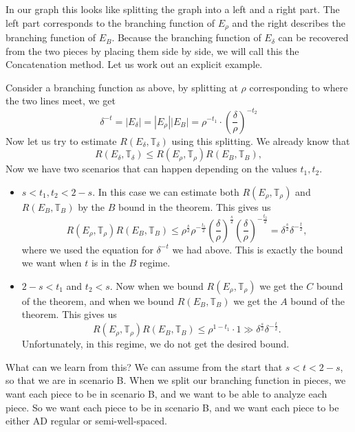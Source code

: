 \documentclass[12pt]{amsart}
\newcommand{\TT}{\mathbb{T}}
\begin{document}
In our graph this looks like splitting the graph into a left and a right part. The left part corresponds to the branching function of $E_\rho$ and the right describes the branching function of $E_B$. Because the branching function of $E_\delta$ can be recovered from the two pieces by placing them side by side, we will call this the Concatenation method.   Let us work out an explicit example.

\begin{figure}[h]
  \centering
  
\end{figure}
Consider a branching function as above, by splitting at $\rho$ corresponding to where the two lines meet, we get
\[
  \delta^{-t} = |E_\delta| = |E_\rho| |E_B| = \rho^{-t_1} \cdot \left(\frac{\delta}{\rho}\right)^{-t_2}
\]
Now let us try to estimate $R(E_\delta,\TT_\delta)$ using this splitting. We already know that
\[
  R(E_\delta, \TT_\delta) \leq R(E_\rho, \TT_\rho) R(E_B, \TT_B),
\]
Now we have two scenarios that can happen depending on the values $t_1,t_2$. 
\begin{itemize}
  \item $s < t_1,t_2 < 2 - s$. In this case we can estimate both $R(E_\rho, \TT_\rho)$ and $R(E_B, \TT_B)$ by the $B$ bound in the theorem. This gives us
  \[
    R(E_\rho, \TT_\rho) R(E_B, \TT_B) \leq
    \rho^\frac{s}{2} \rho^{-\frac{t_1}{2}} \left(\frac{\delta}{\rho}\right)^{\frac{s}{2}} \left(\frac{\delta}{\rho}\right)^{-\frac{t_2}{2}}
    =
    \delta^{\frac{s}{2}} \delta^{-\frac{t}{2}},
  \]
    where we used the equation for $\delta^{-t}$ we had above. This is exactly the bound we want when $t$ is in the $B$ regime.
  \item $2 - s < t_1$ and $t_2 < s$. Now when we bound $R(E_\rho, \TT_\rho)$ we get the $C$ bound of the theorem, and when we bound $R(E_B, \TT_B)$ we get the $A$ bound of the theorem. This gives us
    \[
R(E_\rho, \TT_\rho) R(E_B, \TT_B) \leq
    \rho^{1 - t_1} \cdot 1
    \gg \delta^{\frac{s}{2}} \delta^{-\frac{t}{2}}.
    \]
    Unfortunately, in this regime, we do not get the desired bound.
\end{itemize}
What can we learn from this?  We can assume from the start that $s < t < 2-s$,  so that we are in scenario B.   When we split our branching function in pieces,  we want each piece to be in scenario B,  and we want to be able to analyze each piece.   So we want each piece to be in scenario B,  and we want each piece to be either AD regular or semi-well-spaced.   
\end{document}
